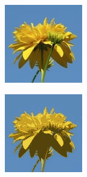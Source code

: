 \begin{figure}[htbp]
    \centering
    \caption{
        Case study: \texttt{flower-14.jpg}, $k=10$.
        Original image, reconstructed image using k-means, reconstruction error,
        and clusterings in sample space.
    }
    \begin{subfigure}[t]{0.32\textwidth}
        \includegraphics[width=\linewidth]{../../rust_code/data/kmeans/flower-14.jpg}
    \end{subfigure}
    \begin{subfigure}[t]{0.32\textwidth}
        \includegraphics[width=\linewidth]{../../python_code/plots/kmeans/flower-14/reconstruction.png}

\end{subfigure}
\end{figure}
